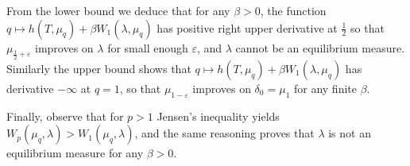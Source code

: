 \documentclass[AHL, Unicode, longabstracts,published]{cedram}
\theoremstyle{plain}
\theoremstyle{plain}
\newcommand*\8{\infty}
\begin{document}
From the lower bound we deduce that for any $\beta>0$, the function $q\mapsto h(T,\mu_q) + \beta W_1(\lambda,\mu_q)$ has positive right upper derivative at $\frac12$ so that $\mu_{\frac12+\varepsilon}$ improves on $\lambda$ for small enough $\varepsilon$, and $\lambda$ cannot be an equilibrium measure. Similarly the upper bound shows that $q\mapsto h(T,\mu_q) + \beta W_1(\lambda,\mu_q)$ has derivative $-\infty$ at $q=1$, so that $\mu_{1-\varepsilon}$ improves on $\delta_0=\mu_1$ for any finite $\beta$.

Finally, observe that for $p>1$ Jensen's inequality yields $W_p(\mu_q,\lambda)>W_1(\mu_q,\lambda)$, and the same reasoning proves that $\lambda$ is not an equilibrium measure for any $\beta>0$.

\vspace*{10pt}


\end{document}
